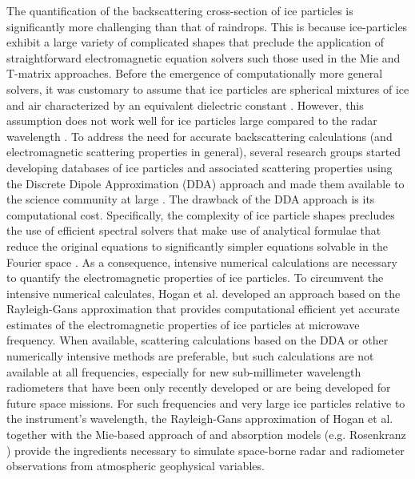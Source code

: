 \documentclass[10pt]{ietbook}
\begin{document}
The quantification of the backscattering cross-section of ice particles is significantly more challenging than that of raindrops.
This is because ice-particles exhibit a large variety of complicated shapes that preclude the application of straightforward 
electromagnetic equation solvers such those used in the Mie and T-matrix approaches.
Before the emergence of computationally more general solvers, it was customary to assume that ice particles are spherical mixtures
of ice and air characterized by an equivalent dielectric constant \cite{battan1973}.  However, this assumption does not work well for
ice particles large compared to the radar wavelength \cite{tyynela2011,liu2004,kuo2016}. To address the need for accurate backscattering
calculations (and electromagnetic scattering properties in general), several research groups started developing databases of ice particles
and associated scattering properties using the Discrete Dipole Approximation (DDA) approach \cite{dda1994} 
and made them available to the science community at large \cite{liu2004,kuo2016}.  The drawback of the DDA approach is its computational
cost. Specifically, the complexity of ice particle shapes precludes the use of efficient spectral solvers that make use of analytical formulae
that reduce the original equations to significantly simpler equations solvable in the Fourier space \cite{spectral_matlab}.  As a consequence, 
intensive numerical
calculations are necessary to quantify the electromagnetic properties of ice particles.  To circumvent the intensive numerical calculates, 
Hogan et al. \cite{hogan2017} developed an approach based on the Rayleigh-Gans approximation that provides computational efficient yet
accurate estimates of the electromagnetic properties of ice particles at microwave frequency.  When available, 
scattering calculations based on the DDA or other numerically intensive methods are preferable, but such calculations are not available at 
all frequencies, especially for new sub-millimeter wavelength radiometers that have been only recently developed or are being developed for
future space missions.  For such frequencies and very large ice particles relative to the instrument's wavelength,  the Rayleigh-Gans 
approximation of Hogan et al. \cite{hogan2017} together with the Mie-based approach of \cite{bhmie2008} and absorption models (e.g.
Rosenkranz \cite{rosenkranz1998}) provide the ingredients necessary to simulate space-borne radar and radiometer observations from 
atmospheric geophysical variables.
\end{document}
